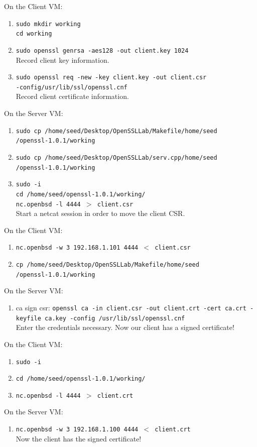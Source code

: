 \documentclass[12pt]{extarticle}
\newcommand{\ben}{\begin{enumerate}}
\newcommand{\een}{\end{enumerate}}
\begin{document}
\noindent
On the Client VM:
\ben
	\item \texttt{sudo mkdir working}\\
		  \texttt{cd working}
	\item \texttt{sudo openssl genrsa -aes128 -out client.key 1024}\\
		  Record client key information.
	\item \texttt{sudo openssl req -new -key client.key -out client.csr\\ -config/usr/lib/ssl/openssl.cnf} \\
		  Record client certificate information.
\een
On the Server VM:
\ben
	\item \texttt{sudo cp /home/seed/Desktop/OpenSSLLab/Makefile/home/seed\\/openssl-1.0.1/working}
	\item \texttt{sudo cp /home/seed/Desktop/OpenSSLLab/serv.cpp/home/seed\\/openssl-1.0.1/working}
	\item \texttt{sudo -i}\\
		  \texttt{cd /home/seed/openssl-1.0.1/working/}\\
		  \texttt{nc.openbsd -l 4444 $>$ client.csr}\\
		  Start a netcat session in order to move the client CSR.
\een
On the Client VM:
\ben
	\item \texttt{nc.openbsd -w 3 192.168.1.101 4444 $<$ client.csr}
	\item \texttt{cp /home/seed/Desktop/OpenSSLLab/Makefile/home/seed\\/openssl-1.0.1/working}
\een
On the Server VM:
\ben
	\item ca sign csr: \texttt{openssl ca -in client.csr -out client.crt -cert ca.crt -keyfile ca.key -config /usr/lib/ssl/openssl.cnf} \\
	Enter the credentials necessary. Now our client has a signed certificate!
\een
On the Client VM:
\ben
	\item \texttt{sudo -i}
	\item \texttt{cd /home/seed/openssl-1.0.1/working/}
	\item \texttt{nc.openbsd -l 4444 $>$ client.crt}
\een
On the Server VM:
\ben
	\item \texttt{nc.openbsd -w 3 192.168.1.100 4444 $<$ client.crt} \\
	Now the client has the signed certificate!
\een

		
\end{document}
